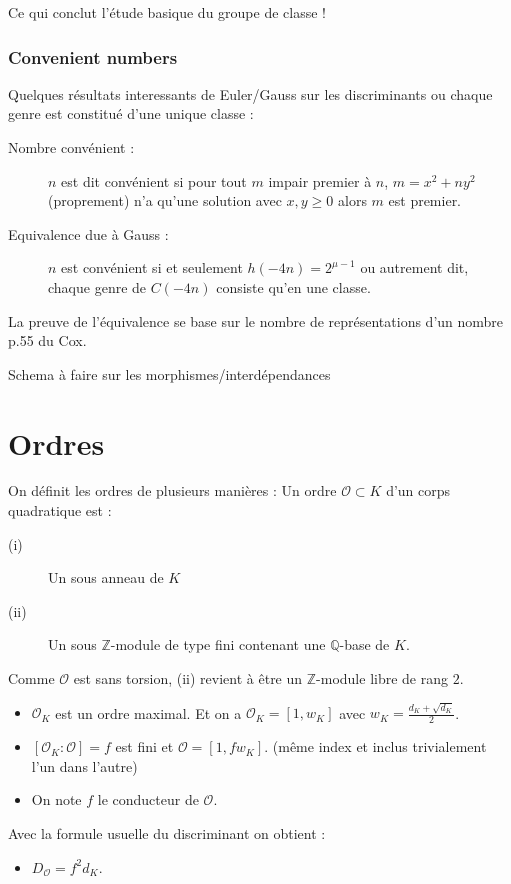 \documentclass[12pt]{article}
\theoremstyle{plain}
\newcommand{\Z}{\mathbb{Z}}
\newcommand{\Q}{\mathbb{Q}}
\newcommand{\Or}{\mathcal{O}}
\newcommand{\OK}{\mathcal{O}_{K}}
\begin{document}
Ce qui conclut l'étude basique du groupe de classe !

\subsubsection{Convenient numbers}
Quelques résultats interessants de Euler/Gauss sur les discriminants ou chaque genre est constitué d'une unique classe :

\begin{description}
    \item[Nombre convénient :] $n$ est dit convénient si pour tout $m$ impair premier à $n$, $m=x^2+ny^2$ (proprement) n'a qu'une solution avec $x,y\geq0$ alors $m$ est premier.
    \item[Equivalence due à Gauss :] $n$ est convénient si et seulement $h(-4n)=2^{\mu-1}$ ou autrement dit, chaque genre de $C(-4n)$ consiste qu'en une classe.
\end{description}

La preuve de l'équivalence se base sur le nombre de représentations d'un nombre p.55 du Cox.

Schema à faire sur les morphismes/interdépendances

\newpage

\section{Ordres}
On définit les ordres de plusieurs manières : Un ordre $\Or\subset K$ d'un corps quadratique est :
\begin{description}
    \item[(i)] Un sous anneau de $K$
    \item[(ii)] Un sous $\Z$-module de type fini contenant une $\Q$-base de $K$.
\end{description}
Comme $\Or$ est sans torsion, (ii) revient à être un $\Z$-module libre de rang $2$.

\begin{itemize}
    \item $\OK$ est un ordre maximal. Et on a $\OK=[1, w_K]$ avec $w_K=\frac{d_K+\sqrt{d_K}}{2}$.
    \item $[\OK:\Or]=f$ est fini et $\Or=[1,fw_K]$. (même index et inclus trivialement l'un dans l'autre)
    \item On note $f$ le conducteur de $\Or$.
\end{itemize}

Avec la formule usuelle du discriminant on obtient :
\begin{itemize}
    \item $D_{\Or}=f^2d_K$.
\end{itemize}
\end{document}

